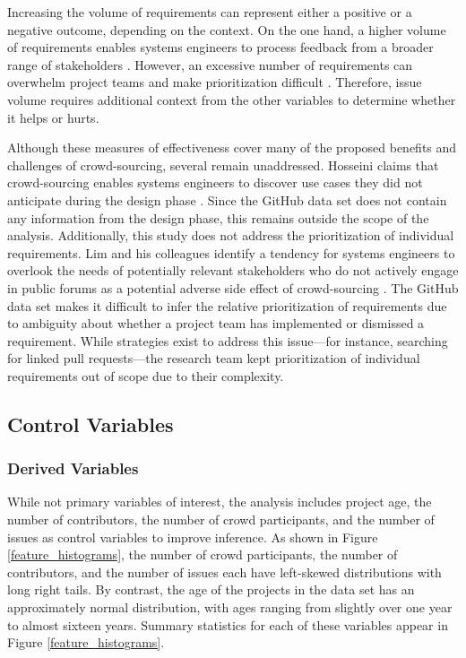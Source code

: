 Increasing the volume of requirements can represent either a positive or a negative outcome, depending on the context. On the one hand, a higher volume of requirements enables systems engineers to process feedback from a broader range of stakeholders \cite{hosseini}. However, an excessive number of requirements can overwhelm project teams and make prioritization difficult \cite{groen, stakenet, stakerare}. Therefore, issue volume requires additional context from the other variables to determine whether it helps or hurts.

Although these measures of effectiveness cover many of the proposed benefits and challenges of crowd-sourcing, several remain unaddressed. Hosseini claims that crowd-sourcing enables systems engineers to discover use cases they did not anticipate during the design phase \cite{hosseini}. Since the GitHub data set does not contain any information from the design phase, this remains outside the scope of the analysis. Additionally, this study does not address the prioritization of individual requirements. Lim and his colleagues identify a tendency for systems engineers to overlook the needs of potentially relevant stakeholders who do not actively engage in public forums as a potential adverse side effect of crowd-sourcing \cite{stakenet}. The GitHub data set makes it difficult to infer the relative prioritization of requirements due to ambiguity about whether a project team has implemented or dismissed a requirement. While strategies exist to address this issue---for instance, searching for linked pull requests---the research team kept prioritization of individual requirements out of scope due to their complexity.

\subsection{Control Variables}

\subsubsection{Derived Variables}

While not primary variables of interest, the analysis includes project age, the number of contributors, the number of crowd participants, and the number of issues as control variables to improve inference. As shown in Figure \ref{feature_histograms}, the number of crowd participants, the number of contributors, and the number of issues each have left-skewed distributions with long right tails. By contrast, the age of the projects in the data set has an approximately normal distribution, with ages ranging from slightly over one year to almost sixteen years. Summary statistics for each of these variables appear in Figure \ref{feature_histograms}.

